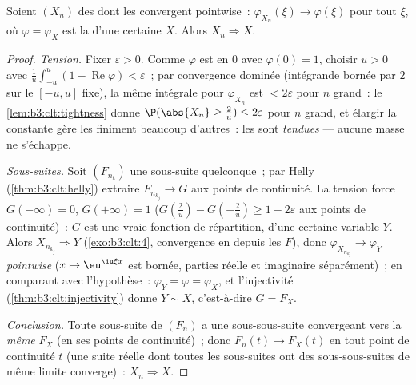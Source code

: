 \begin{theorem}
\label{thm:b3:clt:levy}
Soient $(X_n)$ des  dont les  convergent pointwise~: $\varphi_{X_n}(\xi)
\to \varphi(\xi)$ pour tout $\xi$, où $\varphi = \varphi_X$
est la  d'une certaine  $X$. Alors $X_n \Rightarrow X$.
\end{theorem}

\begin{proof}
\emph{Tension.} Fixer $\varepsilon > 0$. Comme $\varphi$ est
 en $0$ avec $\varphi(0) = 1$, choisir $u > 0$ avec
$\frac1u\int_{-u}^u(1 - \operatorname{Re}\varphi) <
\varepsilon$~; par convergence dominée (intégrande bornée
par $2$ sur le $[-u,u]$ fixe), la même intégrale pour
$\varphi_{X_n}$ est $< 2\varepsilon$ pour $n$ grand~: le
\cref{lem:b3:clt:tightness} donne $\P(\abs{X_n} \geq
\frac2u) \leq 2\varepsilon$ pour $n$ grand, et élargir la
constante gère les finiment beaucoup d'autres~: les 
sont \emph{tendues} --- aucune masse ne s'échappe.

\emph{Sous-suites.} Soit $(F_{n_k})$ une sous-suite
quelconque~; par Helly (\cref{thm:b3:clt:helly}) extraire
$F_{n_{k_j}} \to G$ aux points de continuité. La tension
force $G(-\infty) = 0$, $G(+\infty) = 1$ ($G(\frac2u) -
G(-\frac2u) \geq 1 - 2\varepsilon$ aux points de
continuité)~: $G$ est une vraie fonction de répartition,
d'une certaine variable $Y$. Alors $X_{n_{k_j}} \Rightarrow
Y$ (\cref{exo:b3:clt:4}, convergence en  depuis les $F$),
donc $\varphi_{X_{n_{k_j}}} \to \varphi_Y$ \emph{pointwise}
($x \mapsto \eu^{\iu\xi x}$ est  bornée, parties
réelle et imaginaire séparément)~; en comparant avec
l'hypothèse~: $\varphi_Y = \varphi = \varphi_X$, et
l'injectivité (\cref{thm:b3:clt:injectivity}) donne $Y \sim
X$, c'est-à-dire $G = F_X$.

\emph{Conclusion.} Toute sous-suite de $(F_n)$ a une
sous-sous-suite convergeant vers la \emph{même} $F_X$ (en
ses points de continuité)~; donc $F_n(t) \to F_X(t)$ en tout
point de continuité $t$ (une suite réelle dont toutes les
sous-suites ont des sous-sous-suites de même limite
converge)~: $X_n \Rightarrow X$.
\end{proof}


